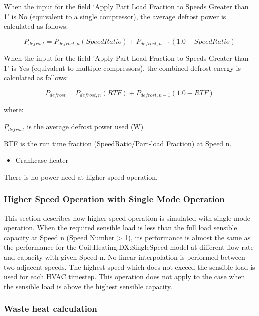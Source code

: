 When the input for the field `Apply Part Load Fraction to Speeds Greater than 1' is No (equivalent to a single compressor), the average defrost power is calculated as follows:

\begin{equation}
{P_{defrost}} = {P_{defrost,n}}(SpeedRatio) + {P_{defrost,n - 1}}(1.0 - SpeedRatio)
\end{equation}

When the input for the field 'Apply Part Load Fraction to Speeds Greater than 1' is Yes (equivalent to multiple compressors), the combined defrost energy is calculated as follows:

\begin{equation}
{P_{defrost}} = {P_{defrost,n}}(RTF) + {P_{defrost,n - 1}}(1.0 - RTF)
\end{equation}

where:

\({P_{defrost}}\) is the average defrost power used (W)

RTF is the run time fraction (SpeedRatio/Part-load Fraction) at Speed n.

\begin{itemize}
  \item Crankcase heater
\end{itemize}

There is no power need at higher speed operation.

\subsubsection{Higher Speed Operation with Single Mode Operation}\label{higher-speed-operation-with-single-mode-operation-1}

This section describes how higher speed operation is simulated with single mode operation. When the required sensible load is less than the full load sensible capacity at Speed n (Speed Number \textgreater{} 1), its performance is almost the same as the performance for the Coil:Heating:DX:SingleSpeed model at different flow rate and capacity with given Speed n. No linear interpolation is performed between two adjacent speeds. The highest speed which does not exceed the sensible load is used for each HVAC timestep. This operation does not apply to the case when the sensible load is above the highest sensible capacity.

\subsubsection{Waste heat calculation}\label{waste-heat-calculation-1-000}

